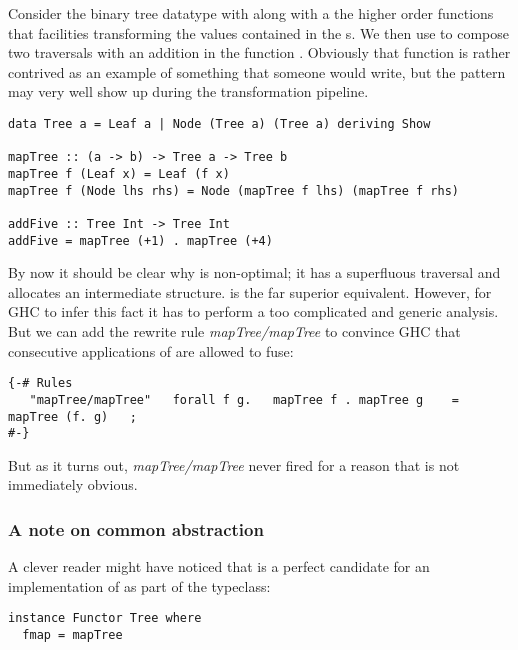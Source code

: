 Consider the binary tree datatype  with along with a the higher order  functions that
facilities transforming the values contained in the s. We then use  to compose two
traversals with an addition in the function . Obviously that function is rather contrived as
an example of something that someone would write, but the pattern may very well show up during the transformation pipeline.


\begin{listing}[H]
\begin{verbatim}
data Tree a = Leaf a | Node (Tree a) (Tree a) deriving Show

mapTree :: (a -> b) -> Tree a -> Tree b
mapTree f (Leaf x) = Leaf (f x)
mapTree f (Node lhs rhs) = Node (mapTree f lhs) (mapTree f rhs)

addFive :: Tree Int -> Tree Int
addFive = mapTree (+1) . mapTree (+4)
\end{verbatim}
\end{listing}

By now it should be clear why  is non-optimal; it has a superfluous traversal and allocates an
intermediate structure.  is the far superior equivalent. However, for GHC to infer this fact
it has to perform a too complicated and generic analysis. But we can add the rewrite rule \textit{mapTree/mapTree}
to convince GHC that consecutive applications of  are allowed to fuse:

\begin{verbatim}
{-# Rules
   "mapTree/mapTree"   forall f g.   mapTree f . mapTree g    = mapTree (f. g)   ;
#-}
\end{verbatim}

But as it turns out, \textit{mapTree/mapTree} never fired for a reason that is not immediately obvious.

\subsubsection{A note on common abstraction}

A clever reader might have noticed that  is a perfect candidate for an implementation of 
as part of the  typeclass: 

\begin{verbatim}
instance Functor Tree where
  fmap = mapTree
\end{verbatim}



